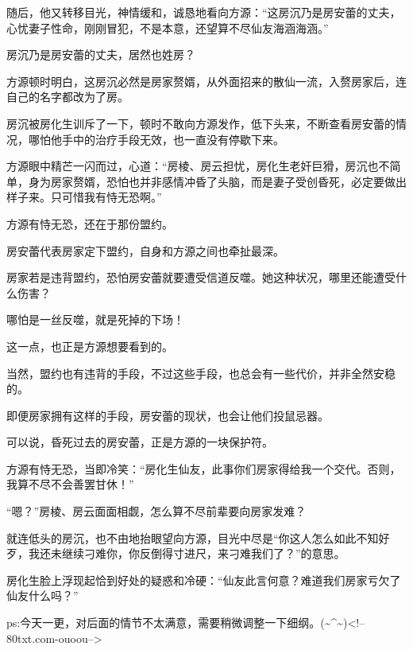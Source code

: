 \begin{this_body}
随后，他又转移目光，神情缓和，诚恳地看向方源：“这房沉乃是房安蕾的丈夫，心忧妻子性命，刚刚冒犯，不是本意，还望算不尽仙友海涵海涵。”

房沉乃是房安蕾的丈夫，居然也姓房？

方源顿时明白，这房沉必然是房家赘婿，从外面招来的散仙一流，入赘房家后，连自己的名字都改为了房。

房沉被房化生训斥了一下，顿时不敢向方源发作，低下头来，不断查看房安蕾的情况，哪怕他手中的治疗手段无效，也一直没有停歇下来。

方源眼中精芒一闪而过，心道：“房棱、房云担忧，房化生老奸巨猾，房沉也不简单，身为房家赘婿，恐怕也并非感情冲昏了头脑，而是妻子受创昏死，必定要做出样子来。只可惜我有恃无恐啊。”

方源有恃无恐，还在于那份盟约。

房安蕾代表房家定下盟约，自身和方源之间也牵扯最深。

房家若是违背盟约，恐怕房安蕾就要遭受信道反噬。她这种状况，哪里还能遭受什么伤害？

哪怕是一丝反噬，就是死掉的下场！

这一点，也正是方源想要看到的。

当然，盟约也有违背的手段，不过这些手段，也总会有一些代价，并非全然安稳的。

即便房家拥有这样的手段，房安蕾的现状，也会让他们投鼠忌器。

可以说，昏死过去的房安蕾，正是方源的一块保护符。

方源有恃无恐，当即冷笑：“房化生仙友，此事你们房家得给我一个交代。否则，我算不尽不会善罢甘休！”

“嗯？”房棱、房云面面相觑，怎么算不尽前辈要向房家发难？

就连低头的房沉，也不由地抬眼望向方源，目光中尽是“你这人怎么如此不知好歹，我还未继续刁难你，你反倒得寸进尺，来刁难我们了？”的意思。

房化生脸上浮现起恰到好处的疑惑和冷硬：“仙友此言何意？难道我们房家亏欠了仙友什么吗？”

ps:今天一更，对后面的情节不太满意，需要稍微调整一下细纲。(\~{}\^{}\~{})<!--80txt.com-ouoou-->

\end{this_body}

